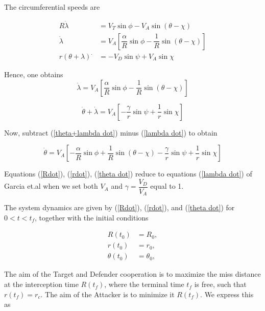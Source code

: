 The circumferential speeds are

\begin{equation*}
\begin{split}
R \dot{\lambda}& = V_T \sin \phi - V_A \sin (\theta - \chi)\\
\dot{\lambda} &= V_A [\dfrac{\alpha}{R} \sin \phi - \dfrac{1}{R} \sin (\theta - \chi)]\\
r (\theta + \lambda)^. &= - V_D \sin \psi + V_A \sin \chi
\end{split}
\end{equation*}  

Hence, one obtains 
\begin{equation}
\dot{\lambda} = V_A [\dfrac{\alpha}{R} \sin \phi - \dfrac{1}{R} \sin (\theta - \chi)]
\label{lambda dot}
\end{equation}

\begin{equation}
\dot{\theta} + \dot{\lambda} = V_A [-\dfrac{\gamma}{r}\sin \psi + \dfrac{1}{r} \sin \chi]
\label{theta+lambda dot}
\end{equation}

Now, subtract (\ref{theta+lambda dot}) minus (\ref{lambda dot}) to obtain

\begin{equation}
\dot{\theta} = V_A [- \dfrac{\alpha}{R} \sin \phi + \dfrac{1}{R} \sin(\theta - \chi) - \dfrac{\gamma}{r} \sin \psi + \dfrac{1}{r}\sin \chi]
\label{theta dot}
\end{equation} 

Equations (\ref{Rdot}), (\ref{rdot}), (\ref{theta dot}) reduce to equations (\ref{lambda dot}) of Garcia et.al \cite{pachter2014active} when we set both $V_A$ and $\gamma=\dfrac{V_D}{V_A}$ equal to 1. 

The system dynamics are given by (\ref{Rdot}), (\ref{rdot}), and (\ref{theta dot}) for $0< t < t_f$, together with the initial conditions 

\begin{equation*}
	\begin{split}
		R(t_0)&=R_0,\\
		r(t_0)&= r_0,\\
		\theta(t_0)&=\theta_0,
	\end{split}
\end{equation*}

The aim of the Target and Defender cooperation is to maximize
the miss distance at the
interception time $R(t_f)$, where the terminal time $t_f$ is free,
such that $r(t_f) = r_c$. The aim of the Attacker is to
minimize it $R(t_f)$. We express this as

